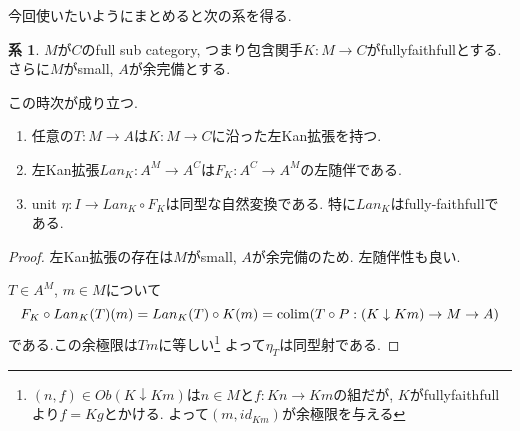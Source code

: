 \documentclass[dvipdfmx,a4paper,11pt]{article}
\newcommand{\colim}{{\rm colim}}
\theoremstyle{definition}
\newtheorem{cor}[thm]{系}
\begin{document}
今回使いたいようにまとめると次の系を得る.
\begin{tcolorbox}
 [colback = white, colframe = green!35!black, fonttitle = \bfseries,breakable = true]
\begin{cor}
\label{cor-leftkan-small}
$M$が$C$のfull sub category, つまり包含関手$K : M \to C$がfullyfaithfullとする.
さらに$M$がsmall, $A$が余完備とする. 

この時次が成り立つ.
\begin{enumerate}
\item 任意の$T : M \to A$は$K : M \to C$に沿った左Kan拡張を持つ.
\item 左Kan拡張$Lan_{K} : A^M \to A^C$は$F_{K} : A^C \to A^M$の左随伴である.
\item unit $\eta : I \to Lan_{K} \circ F_{K}$は同型な自然変換である. 特に$Lan_{K}$はfully-faithfullである.
\end{enumerate}
\end{cor}
\end{tcolorbox}
\begin{proof}
左Kan拡張の存在は$M$がsmall, $A$が余完備のため. 
左随伴性も良い.

$T \in A^M$, $m \in M$について
$$
 F_{K}\circ Lan_{K} (T)(m)
= Lan_{K} (T) \circ K(m)
 =\colim (T \circ P : (K \downarrow Km ) \to M \to A)
$$
である.この余極限は$Tm$に等しい\footnote{$(n, f) \in Ob(K \downarrow Km)$は$n \in M$と$f : Kn \to Km$の組だが, $K$がfullyfaithfullより$f= Kg$とかける. よって$(m, id_{Km})$が余極限を与える}
よって$\eta_T$は同型射である. 
\end{proof}



\end{document}

